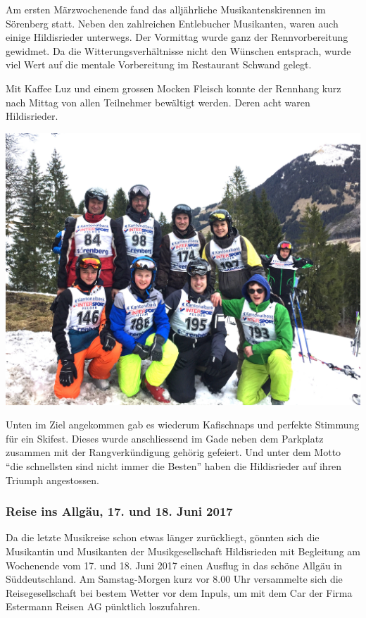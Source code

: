 \begin{history}

    Am ersten Märzwochenende fand das alljährliche Musikantenskirennen im
    Sörenberg statt. Neben den zahlreichen Entlebucher Musikanten, waren auch
    einige Hildisrieder unterwegs. Der Vormittag wurde ganz der Rennvorbereitung
    gewidmet. Da die Witterungsverhältnisse nicht den Wünschen entsprach, wurde
    viel Wert auf die mentale Vorbereitung im Restaurant Schwand gelegt.

    Mit Kaffee Luz und einem grossen Mocken Fleisch konnte der Rennhang kurz
    nach Mittag von allen Teilnehmer bewältigt werden. Deren acht waren
    Hildisrieder.

    \begin{MulticolFigure}
        \centering
        \includegraphics[width=0.93\linewidth]{./chap/2001-2024/2017/Skirennen-2017.jpg}
    \end{MulticolFigure}

    Unten im Ziel angekommen gab es wiederum Kafischnaps und perfekte Stimmung
    für ein Skifest. Dieses wurde anschliessend im Gade neben dem Parkplatz
    zusammen mit der Rangverkündigung gehörig gefeiert. Und unter dem Motto
    \enquote{die schnellsten sind nicht immer die Besten} haben die Hildisrieder
    auf ihren Triumph angestossen.


    \subsubsection*{Reise ins Allgäu, 17. und 18. Juni 2017}

    Da die letzte Musikreise schon etwas länger zurückliegt, gönnten
    sich die Musikantin und Musikanten der Musikgesellschaft
    Hildisrieden mit Begleitung am Wochenende vom 17. und 18. Juni
    2017 einen Ausflug in das schöne Allgäu in Süddeutschland. Am
    Samstag-Morgen kurz vor 8.00 Uhr versammelte sich die
    Reisegesellschaft bei bestem Wetter vor dem Inpuls, um mit dem Car
    der Firma Estermann Reisen AG pünktlich loszufahren.


\end{history}
